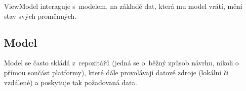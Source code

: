 \documentclass[twoside]{ctuthesis}
\begin{document}
ViewModel interaguje s~modelem, na základě dat, která mu model vrátí, mění stav svých proměnných.

\subsection{Model}

Model se často skládá z~repozitářů (jedná se o~běžný způsob návrhu, nikoli o přímou součást platformy), které dále provolávají datové zdroje (lokální či vzdálené) a poskytuje tak požadovaná data.

\newpage


%
%
\end{document}
